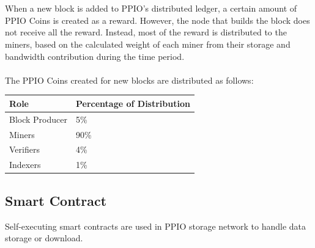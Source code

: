 \documentclass[10pt,a4paper]{article}
\begin{document}
 \vspace{-0.5em}
\\ \\When a new block is added to PPIO’s distributed ledger, a certain amount of PPIO Coins is created as a reward. However, the node that builds the block does not receive all the reward. Instead, most of the reward is distributed to the miners, based on the calculated weight of each miner from their storage and bandwidth contribution during the time period.\\\\
The PPIO Coins created for new blocks are distributed as follows:\\
 \vspace{-0.5em}
 \begin{center}
\begin{tabular}{|p{4cm}<{\centering}|p{4cm}<{\centering}|}%
\hline  %
Role&Percentage of Distribution \\
 \hline  %
Block Producer &5\% \\
 \hline  %
 Miners&90\%\\
 \hline  %
   Verifiers&4\% \\
 \hline  %
Indexers &1\%\\

\hline %
\end{tabular}
\end{center} 
      \subsection{Smart Contract}  %
Self-executing smart contracts are used in PPIO storage network to handle data storage or download.
 \vspace{-0.8em}
\\
\end{document}
